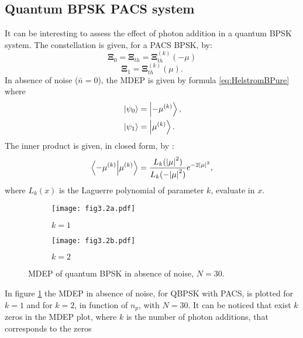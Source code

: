     \subsection{Quantum BPSK PACS system}
    It can be interesting to assess the effect of photon addition in a quantum BPSK system.
    The constellation is given, for a PACS BPSK, by:
    \begin{equation}
        \pmb{\Xi}_0 =  \pmb{\Xi}_{th} = \pmb{\Xi}_{th}^{(k)}(-\mu)
    \end{equation}
    \begin{equation*}
        \pmb{\Xi}_1 =  \pmb{\Xi}_{th}^{(k)}(\mu).
    \end{equation*}
    In absence of noise ($\bar{n}=0$), the MDEP is given by formula \ref{eq:HelstromBPure} where
    \begin{equation}
        \begin{split}
            &\ket{\psi_0}=\ket{-\mu^{(k)}},\\
            &\ket{\psi_1}=\ket{\mu^{(k)}}.
        \end{split}
    \end{equation}
    The inner product is given, in closed form, by \cite{PACSDisc}:
    \begin{equation}
        \braket{-\mu^{(k)}}{\mu^{(k)}} = \frac{L_k(\absolutevalue{\mu}^2)}{L_k(-\absolutevalue{\mu}^2)}
        e^{-2\absolutevalue{\mu}^2},
        \label{eq:innerp_nonNoise}
    \end{equation}
    where $L_k(x)$ is the Laguerre polynomial of parameter $k$, evaluate in $x$.
    \begin{figure}[tbp]
        \begin{subfigure}{0.5\textwidth}
            \texttt{[image: fig3.2a.pdf]}
            \caption{$k=1$}
        \end{subfigure}
        \begin{subfigure}{0.5\textwidth}
            \texttt{[image: fig3.2b.pdf]}
            \caption{$k=2$}
        \end{subfigure}
        \caption{MDEP of quantum BPSK in absence of noise, $N=30$.}
        \label{fig:3.2}
    \end{figure}
    In figure \ref{fig:3.2} the MDEP in absence of noise, for QBPSK with PACS, is plotted for
    $k=1$ and for $k=2$, in function of $n_p$, with $N=30$. It can be noticed that exist $k$ zeros
    in the MDEP plot, where $k$ is the number of photon additions, that corresponds to the zeros
